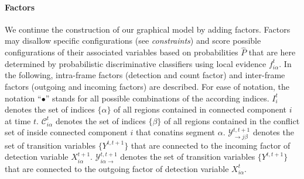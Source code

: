 \documentclass[10pt,twocolumn,letterpaper]{article}
\begin{document}

\paragraph{Factors} We continue the construction of our graphical model by adding factors.
Factors %
may disallow specific configurations (see \emph{constraints}) and
score possible configurations of their associated variables based on
probabilities $\hat{P}$ that are here determined by
probabilistic discriminative classifiers using local evidence $f_{i\alpha}^t$. 
In the following, intra-frame factors (detection and count factor) 
and inter-frame factors (outgoing and incoming factors) are described.
For ease of notation, 
the notation ``$\bullet$'' stands for all possible combinations of the according indices.
$I_i^t$ denotes the set of indices $\{\alpha\}$ of all regions contained in connected component $i$
at time $t$. $\mathcal{C}_{i\alpha}^t$ denotes the set of indices $\{\beta\}$ of all regions
contained in the conflict set of inside connected component $i$ that conatins segment $\alpha$.
$\mathcal{Y}_{\rightarrow j\beta}^{t,t+1}$ denotes the set of transition variables $\{Y^{t,t+1}\}$ that
are connected to the incoming factor of detection variable $X_{i\alpha}^{t+1}$.
$\mathcal{Y}_{i\alpha \rightarrow}^{t,t+1}$ denotes the set of transition variables $\{Y^{t,t+1}\}$ that
are connected to the outgoing factor of detection variable $X_{i\alpha}^{t}$.

\end{document}
